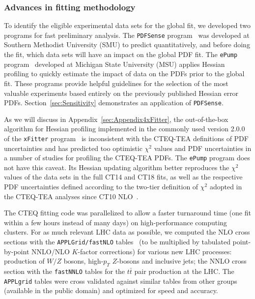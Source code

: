 \subsubsection{Advances in fitting methodology \label{sec:Advances} }
To identify the eligible experimental
data sets for the global fit, we developed two programs for fast preliminary analysis. The \texttt{PDFSense} program~\cite{Wang:2018heo} 
was developed at Southern Methodist University (SMU)
to predict quantitatively, and before doing the fit, which data sets
will have an impact on the global PDF fit. The \texttt{ePump} program~\cite{Schmidt:2018hvu} developed at Michigan State University (MSU)
applies Hessian profiling to quickly estimate the impact of data on the
PDFs prior to the global fit. These programs provide helpful guidelines
for the selection of the most valuable experiments based entirely on the previously published Hessian error PDFs.  Section~\ref{sec:Sensitivity} demonstrates an application of \texttt{PDFSense}.

 As we will discuss in Appendix~\ref{sec:Appendix4xFitter}, the out-of-the-box algorithm for Hessian profiling implemented in the commonly used version 2.0.0 of the \texttt{xFitter} program~\cite{Alekhin:2014irh} is inconsistent with the CTEQ-TEA definitions of PDF uncertainties and has predicted  too optimistic $\chi^2$ values and PDF uncertainties in a number 
 of studies for profiling the CTEQ-TEA PDFs. The \texttt{ePump} program does not have this caveat. 
 Its Hessian updating algorithm better reproduces the $\chi^2$ values of the data sets in the full CT14 and CT18 fits, 
 as well as the respective PDF uncertainties defined according to the two-tier definition of $\chi^2$ adopted in the CTEQ-TEA analyses since CT10 NLO~\cite{Gao:2013xoa}. 

The CTEQ fitting code was parallelized to allow a faster turnaround
time (one fit within a few hours instead of many days) on high-performance
computing clusters. For as much relevant LHC data as possible, we computed
the NLO cross sections with the \texttt{APPLGrid/fastNLO} tables~\cite{Kluge:2006xs,Carli:2010rw}  (to be multiplied by tabulated point-by-point NNLO/NLO $K$-factor corrections)
for various new LHC processes: production of $W/Z$ bosons, high-$p_{T}$
$Z$-bosons and inclusive jets; the NNLO cross section with the \texttt{fastNNLO} tables \cite{Czakon:2017dip,fastnnlo:grids} for the $t\bar{t}$ pair production at the LHC. The \texttt{APPLgrid} tables were cross validated
against similar tables from other groups (available in the public
domain) and optimized for speed and accuracy. 

